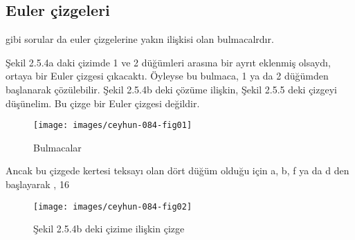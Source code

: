 \documentclass[11pt]{amsbook}
\begin{document}
\subsection{Euler çizgeleri}
gibi sorular da euler çizgelerine yakın ilişkisi olan bulmacalrdır.

Şekil 2.5.4a daki çizimde 1 ve 2 düğümleri arasına bir ayrıt eklenmiş olsaydı, ortaya bir Euler çizgesi çıkacaktı. Öyleyse bu bulmaca, 1 ya da 2 düğümden başlanarak çözülebilir. Şekil 2.5.4b deki çözüme ilişkin, Şekil 2.5.5 deki çizgeyi düşünelim. Bu çizge bir Euler çizgesi değildir.

\begin{figure}[htb]
	\centering
	\texttt{[image: images/ceyhun-084-fig01]}
	\caption{Bulmacalar}
\end{figure}

Ancak bu çizgede kertesi teksayı olan dört düğüm olduğu için a, b, f ya da d den başlayarak , 16


\begin{figure}[htb]
	\centering
	\texttt{[image: images/ceyhun-084-fig02]}
	\caption{Şekil 2.5.4b deki çizime ilişkin çizge}
\end{figure}
\end{document}
